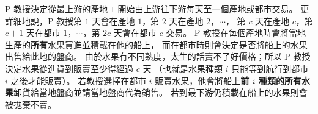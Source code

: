 P 教授決定從最上游的產地 \begin{math}1\end{math}
開始由上游往下游每天至一個產地或都市交易。 更詳細地說，P 教授第
\begin{math}1\end{math} 天會在產地 \begin{math}1\end{math}，第
\begin{math}2\end{math} 天在產地
\begin{math}2\end{math}，\begin{math}\cdots\end{math}， 第
\begin{math}c\end{math} 天在產地 \begin{math}c\end{math}，第
\begin{math}c+1\end{math} 天在都市
\begin{math}1\end{math}，\begin{math}\cdots\end{math}，第
\begin{math}2c\end{math} 天會在都市 \begin{math}c\end{math} 交易。 P
教授在每個產地時會將當地生產的\textbf{所有}水果買進並積載在他的船上，
而在都市時則會決定是否將船上的水果出售給此地的盤商。
由於水果有不同熟度，太生的話賣不了好價格；所以 P
教授決定水果從進貨到販賣至少得經過 \begin{math}c\end{math} 天
（也就是水果種類 \begin{math}i\end{math} 只能等到航行到都市
\begin{math}i\end{math} 之後才能販賣）。 若教授選擇在都市
\begin{math}i\end{math} 販賣水果，他會將船上\textbf{前
\begin{math}i\end{math}
種類的所有水果}卸貨給當地盤商並請當地盤商代為銷售。
若到最下游仍積載在船上的水果則會被拋棄不賣。

